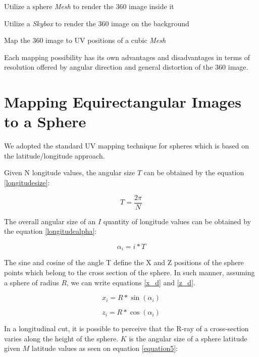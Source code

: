 \documentclass[12pt]{article}
\begin{document}
\begin{enumerate}
  \begin{item}Utilize a sphere \textit{Mesh} to render the 360 image inside it\end{item}
  \begin{item} Utilize a \textit{Skybox} to render the 360 image on the background\end{item}
  \begin{item} Map the 360 image to UV positions of a cubic \textit{Mesh} \end{item}
\end{enumerate}

Each mapping possibility has its own advantages and disadvantages in terms of resolution offered by angular direction and general distortion of the 360 image.

\section{Mapping Equirectangular Images to a Sphere}
We adopted the standard UV mapping technique for spheres which is based on the latitude/longitude approach.  

Given N longitude values, the angular size $T$ can be obtained by the equation \ref{longitudesize}:

\begin{equation}
T = \frac{2 \pi}{N}
\label{longitudesize}
\end{equation}

The overall angular size of an $I$ quantity of longitude values can be obtained by the equation \ref{longitudealpha}:

\begin{equation}
\alpha_{i} = i * T
\label{longitudealpha}
\end{equation}

The sine and cosine of the angle T define the X and Z positions of the sphere points which belong to the cross section of the sphere. In such manner, assuming a sphere of radius $R$, we can write equations \ref{x_d} and \ref{z_d}. 

\begin{equation}
x_{i} = R * \sin(\alpha_{i})
\label{x_d}
\end{equation}

\begin{equation}
z_{i} = R * \cos(\alpha_{i})
\label{z_d}
\end{equation}

In a longitudinal cut, it is possible to perceive that the R-ray of a cross-section varies along the height of the sphere. $K$ is the angular size of a sphere latitude given $M$ latitude values as seen on equation \ref{equation5}:
\end{document}
